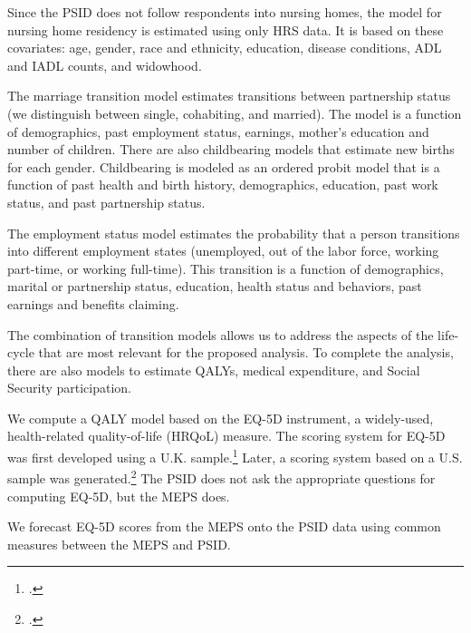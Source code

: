 \noindent Since the PSID does not follow respondents into nursing homes, the model for nursing home residency is estimated using only HRS data. It is based on these covariates: age, gender, race and ethnicity, education, disease conditions, ADL and IADL counts, and widowhood.

\noindent The marriage transition model estimates transitions between partnership status (we distinguish between single, cohabiting, and married).
The model is a function of demographics, past employment status, earnings, mother's education and number of children.
There are also childbearing models that estimate new births for each gender.
Childbearing is modeled as an ordered probit model that is a function of past health and birth history, demographics, education, past work status, and past partnership status.

\noindent The employment status model estimates the probability that a person transitions into different employment states (unemployed, out of the labor force, working part-time, or working full-time). This transition is a function of demographics, marital or partnership status, education, health status and behaviors, past earnings and benefits claiming.



\noindent The combination of transition models allows us to address the aspects of the life-cycle that are most relevant for the proposed analysis. To complete the analysis, there are also models to estimate QALYs, medical expenditure, and Social Security participation.

\noindent We compute a QALY model based on the EQ-5D instrument, a widely-used, health-related
quality-of-life (HRQoL) measure. %
The scoring system for EQ-5D was first developed using a U.K. sample.\footnote{\citet{Dolan_1997_Modeling_MC}.} Later, a scoring system based on
a U.S. sample was generated.\footnote{\citet{Shaw_etal_2005_EQ5D_MC}.} The PSID does not ask the appropriate questions for computing EQ-5D, but the MEPS does.

\noindent We forecast EQ-5D scores from the MEPS onto the PSID data using common measures between the MEPS and PSID.

